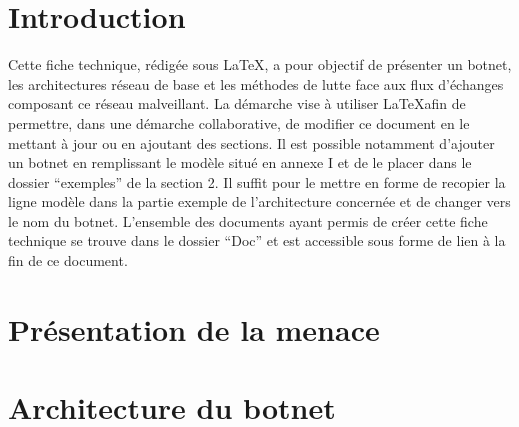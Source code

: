 \documentclass[a4paper]{article}
\author{Batany David}
\date{2019}
\begin{document}
\maketitle


\newpage\tableofcontents

\section*{Introduction}
\par
Cette fiche technique, rédigée sous \LaTeX, a pour objectif de présenter un botnet, les architectures réseau de base et les méthodes de lutte face aux flux d'échanges composant ce réseau malveillant.
\newline La démarche vise à utiliser \LaTeX afin de permettre, dans une démarche collaborative, de modifier ce document en le mettant à jour ou en ajoutant des sections.
\newline Il est possible notamment d'ajouter un botnet en remplissant le modèle situé en annexe I et de le placer dans le dossier "`exemples"' de la section 2.
Il suffit pour le mettre en forme de recopier la ligne modèle dans la partie exemple de l'architecture concernée et de changer vers le nom du botnet.
\newline L'ensemble des documents ayant permis de créer cette fiche technique se trouve dans le dossier "`Doc"' et est accessible sous forme de lien à la fin de ce document.



\newpage\section{Présentation de la menace}





\newpage\section{Architecture du botnet}




\end{document}

